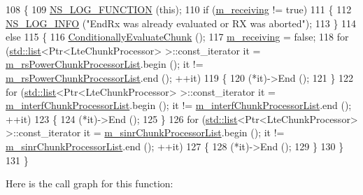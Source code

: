 \begin{DoxyCode}
108 \{
109   \hyperlink{log-macros-disabled_8h_a90b90d5bad1f39cb1b64923ea94c0761}{NS\_LOG\_FUNCTION} (\textcolor{keyword}{this});
110   \textcolor{keywordflow}{if} (\hyperlink{classns3_1_1LteInterference_a12580fdb6df9e6afa3fc4f3c68648bf3}{m\_receiving} != \textcolor{keyword}{true})
111     \{
112       \hyperlink{group__logging_gafbd73ee2cf9f26b319f49086d8e860fb}{NS\_LOG\_INFO} (\textcolor{stringliteral}{"EndRx was already evaluated or RX was aborted"});
113     \}
114   \textcolor{keywordflow}{else}
115     \{
116       \hyperlink{classns3_1_1LteInterference_a18d105beca4a94a1f2b502139540ab12}{ConditionallyEvaluateChunk} ();
117       \hyperlink{classns3_1_1LteInterference_a12580fdb6df9e6afa3fc4f3c68648bf3}{m\_receiving} = \textcolor{keyword}{false};
118       \textcolor{keywordflow}{for} (\hyperlink{openflow-interface_8h_afd9bcfa176617760671b67580f536fa7}{std::list}<Ptr<LteChunkProcessor> >::const\_iterator it = 
      \hyperlink{classns3_1_1LteInterference_a4b261932ab7620cf1303dfbf4cdba6b5}{m\_rsPowerChunkProcessorList}.begin (); it != 
      \hyperlink{classns3_1_1LteInterference_a4b261932ab7620cf1303dfbf4cdba6b5}{m\_rsPowerChunkProcessorList}.end (); ++it)
119         \{
120           (*it)->End ();
121         \}
122       \textcolor{keywordflow}{for} (\hyperlink{openflow-interface_8h_afd9bcfa176617760671b67580f536fa7}{std::list}<Ptr<LteChunkProcessor> >::const\_iterator it = 
      \hyperlink{classns3_1_1LteInterference_abd2337c56d85ec7775f6ae1e7c2036cc}{m\_interfChunkProcessorList}.begin (); it != 
      \hyperlink{classns3_1_1LteInterference_abd2337c56d85ec7775f6ae1e7c2036cc}{m\_interfChunkProcessorList}.end (); ++it)
123         \{
124           (*it)->End ();
125         \}
126       \textcolor{keywordflow}{for} (\hyperlink{openflow-interface_8h_afd9bcfa176617760671b67580f536fa7}{std::list}<Ptr<LteChunkProcessor> >::const\_iterator it = 
      \hyperlink{classns3_1_1LteInterference_ad2b739da02cfdfd8cb49fd34a5d95b7d}{m\_sinrChunkProcessorList}.begin (); it != 
      \hyperlink{classns3_1_1LteInterference_ad2b739da02cfdfd8cb49fd34a5d95b7d}{m\_sinrChunkProcessorList}.end (); ++it)
127         \{
128           (*it)->End (); 
129         \}
130     \}
131 \}
\end{DoxyCode}


Here is the call graph for this function\+:


